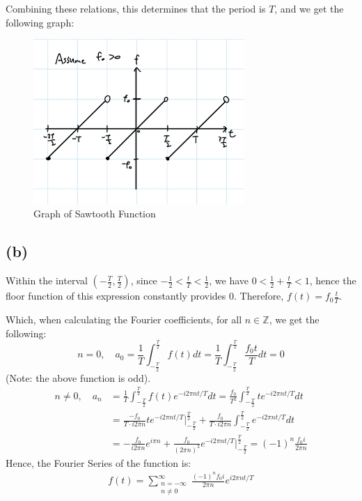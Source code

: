 \documentclass{article}
\newcommand{\ZZ}{\mathbb{Z}}
\begin{document}
Combining these relations, this determines that the period is $T$, and we get the following graph:
\begin{figure}[h!]
    \begin{center}
        \includegraphics[width=80mm]{q4_a.jpg}
        \caption{Graph of Sawtooth Function}
    \end{center}
\end{figure}


\subsection*{(b)}
Within the interval $(-\frac{T}{2},\frac{T}{2})$, since $-\frac{1}{2}<\frac{t}{T}<\frac{1}{2} $, we have $0<\frac{1}{2}+\frac{t}{T}<1$, hence the floor function of this expression constantly provides $0$. Therefore, $f(t) = f_0\frac{t}{T}$.

Which, when calculating the Fourier coefficients, for all $n\in \ZZ$, we get the following:
\begin{equation}
    n=0,\quad a_0 = \frac{1}{T}\int_{-\frac{T}{2}}^\frac{T}{2}f(t)dt = \frac{1}{T}\int_{-\frac{T}{2}}^\frac{T}{2}\frac{f_0t}{T}dt = 0
\end{equation}
(Note: the above function is odd).
\begin{align}
    n\neq 0,\quad a_n &= \frac{1}{T}\int_{-\frac{T}{2}}^\frac{T}{2}f(t)e^{-i2\pi nt/T}dt = \frac{f_0}{T^2}\int_{-\frac{T}{2}}^\frac{T}{2}te^{-i2\pi nt/T}dt\\
    &=\frac{-f_0}{T\cdot i2\pi n}te^{-i2\pi nt/T}\bigg|_{-\frac{T}{2}}^\frac{T}{2} + \frac{f_0}{T\cdot i2\pi n}\int_{-\frac{T}{2}}^\frac{T}{2}e^{-i2\pi nt/T}dt\\
    &= -\frac{f_0}{i2\pi n}e^{i\pi n} +\frac{f_0}{(2\pi n)^2}e^{-i2\pi nt/T}\bigg|_{-\frac{T}{2}}^\frac{T}{2} = (-1)^{n}\frac{f_0 i}{2\pi n}
\end{align}
Hence, the Fourier Series of the function is:
\begin{align}
    f(t) = \sum_{\substack{n=-\infty\\n\neq 0}}^{\infty}\frac{(-1)^n f_0i}{2\pi n}e^{i2\pi nt/T}
\end{align}
\end{document}
